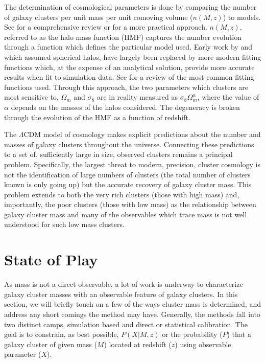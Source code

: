 The determination of cosmological parameters is done by comparing the number of galaxy clusters per unit mass per unit comoving volume ($n(M,z)$) to models. See \cite{Allen2011} for a comprehensive review or \cite{Murray2013} for a more practical approach. $n(M,z)$, referred to as the halo mass function (HMF) captures the number evolution through a function which defines the particular model used. Early work by \cite{Press1974} and \cite{Bond1991} which assumed spherical halos, have largely been replaced by more modern fitting functions which, at the expense of an analytical solution, provide more accurate results when fit to simulation data. See \cite{Murray2013} for a review of the most common fitting functions used. Through this approach, the two parameters which clusters are most sensitive to, $\Omega_m$ and $\sigma_8$ are in reality measured as $\sigma_8\Omega_m^\alpha$, where the value of $\alpha$ depends on the masses of the halos considered. The degeneracy is broken through the evolution of the HMF as a function of redshift. 

The $\Lambda$CDM model of cosmology makes explicit predictions about the number and masses of galaxy clusters throughout the universe. Connecting these predictions to a set of, sufficiently large in size, observed clusters remains a principal problem. Specifically, the largest threat to modern, precision, cluster cosmology is not the identification of large numbers of clusters (the total number of clusters known is only going up) but the accurate recovery of galaxy cluster mass. This problem extends to both the very rich clusters (those with high mass) and, importantly, the poor clusters (those with low mass) as the relationship between galaxy cluster mass and many of the observables which trace mass is not well understood for such low mass clusters.

\section{State of Play}
As mass is not a direct observable, a lot of work is underway to characterize galaxy cluster masses with an observable feature of galaxy clusters. In this section, we will briefly touch on a few of the ways cluster mass is determined, and address any short comings the method may have. Generally, the methods fall into two distinct camps, simulation based and direct or statistical calibration. The goal is to constrain, as best possible, $P(X|M,z)$ or the probability ($P$) that a galaxy cluster of given mass ($M$) located at redshift ($z$) using observable parameter ($X$).


